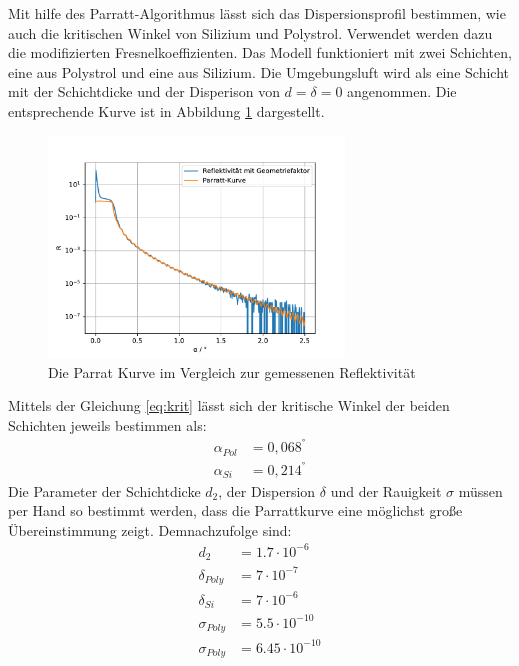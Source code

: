 Mit hilfe des Parratt-Algorithmus lässt sich das Dispersionsprofil bestimmen,
wie auch die kritischen Winkel von Silizium und Polystrol.
Verwendet werden dazu die modifizierten Fresnelkoeffizienten.
Das Modell funktioniert mit zwei Schichten, eine aus Polystrol und eine aus Silizium.
Die Umgebungsluft wird als eine Schicht mit der Schichtdicke und der Disperison von $d = \delta = 0$ angenommen.
Die entsprechende Kurve ist in Abbildung \ref{fig:parratt} dargestellt.
\begin{figure}[h]
    \centering
    \includegraphics[width = 0.7\textwidth]{Auswertung/Graphen/Parrat_Algorthmus.pdf}
    \caption{Die Parrat Kurve im Vergleich zur gemessenen Reflektivität}
    \label{fig:parratt}
\end{figure}
Mittels der Gleichung \eqref{eq:krit} lässt sich der kritische Winkel der beiden Schichten jeweils bestimmen als:
\begin{align}
    \alpha_{Pol} &= 0,068^° \\
    \alpha_{Si}  &= 0,214^°
\end{align}
Die Parameter der Schichtdicke $d_2$, der Dispersion $\delta$ und der Rauigkeit $\sigma$ müssen per Hand so bestimmt werden,
dass die Parrattkurve eine möglichst große Übereinstimmung zeigt.
Demnachzufolge sind:
\begin{align*} 
    d_2 &=  1.7\cdot 10^{-6} \\
    \delta_{Poly} &= 7\cdot 10^{-7} \\
    \delta_{Si} &= 7\cdot 10^{-6} \\
    \sigma_{Poly} &=  5.5\cdot 10^{-10}\\
    \sigma_{Poly} &=  6.45\cdot 10^{-10}
\end{align*}

